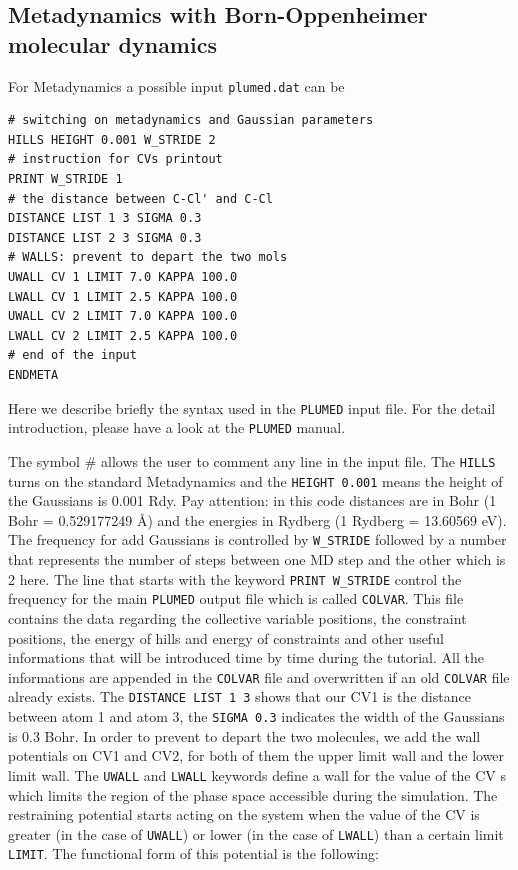 \documentclass[12pt,a4paper]{article}
\begin{document}
\subsection{Metadynamics with Born-Oppenheimer molecular dynamics}

For Metadynamics a possible input \texttt{plumed.dat} can be

\begin{verbatim}
# switching on metadynamics and Gaussian parameters
HILLS HEIGHT 0.001 W_STRIDE 2
# instruction for CVs printout
PRINT W_STRIDE 1
# the distance between C-Cl' and C-Cl
DISTANCE LIST 1 3 SIGMA 0.3
DISTANCE LIST 2 3 SIGMA 0.3
# WALLS: prevent to depart the two mols
UWALL CV 1 LIMIT 7.0 KAPPA 100.0
LWALL CV 1 LIMIT 2.5 KAPPA 100.0
UWALL CV 2 LIMIT 7.0 KAPPA 100.0
LWALL CV 2 LIMIT 2.5 KAPPA 100.0
# end of the input
ENDMETA
\end{verbatim}

Here we describe briefly the syntax used in the \texttt{PLUMED} input file. For the detail introduction, please have a look at the \texttt{PLUMED} manual\cite{PLUMED:manual}.

The symbol \# allows the user to comment any line in the input file. The \texttt{HILLS} turns on the standard Metadynamics and the \texttt{HEIGHT 0.001} means the height of the Gaussians is 0.001 Rdy. Pay attention: in this code distances are in Bohr (1 Bohr = 0.529177249 \AA) and the energies in Rydberg (1 Rydberg  = 13.60569 eV). The frequency for add Gaussians is controlled by \texttt{W\_STRIDE} followed by a number that represents the number of steps between one MD step and the other which is 2 here. The line that starts with the keyword \texttt{PRINT W\_STRIDE} control the frequency for the main \texttt{PLUMED} output file which is called \texttt{COLVAR}. This file contains the data regarding the collective variable positions, the constraint positions, the energy of hills and energy of constraints and other useful informations that will be introduced time by time during the tutorial. All the informations are appended in the \texttt{COLVAR} file and overwritten if an old \texttt{COLVAR} file already exists. The \texttt{DISTANCE LIST 1 3} shows that our CV1 is the distance between atom 1 and atom 3, the \texttt{SIGMA 0.3} indicates the width of the Gaussians is 0.3 Bohr. In order to prevent to depart the two molecules, we add the wall potentials on CV1 and CV2, for both of them the upper limit wall and the lower limit wall. The \texttt{UWALL} and \texttt{LWALL} keywords define a wall for the value of the CV s which limits the region of the phase space accessible during the simulation. The restraining potential starts acting on the system when the value of the CV is greater (in the case of \texttt{UWALL}) or lower (in the case of \texttt{LWALL}) than a certain limit \texttt{LIMIT}. The functional form of this potential is the following:
\end{document}
